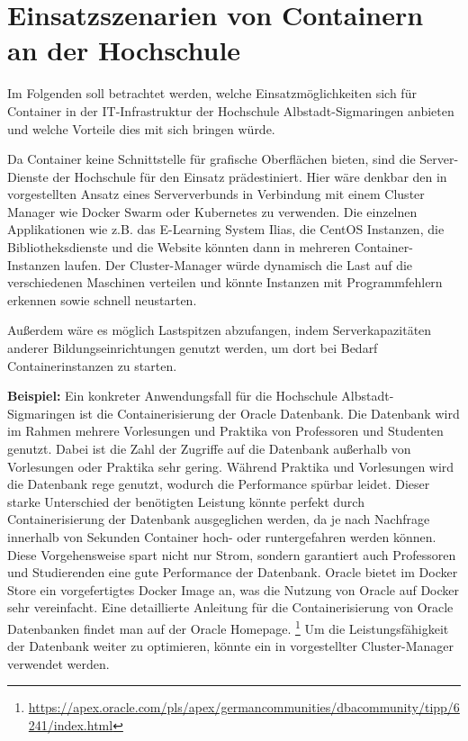 \section{Einsatzszenarien von Containern an der Hochschule}
\label{sec:HS}
Im Folgenden soll betrachtet werden, welche Einsatzmöglichkeiten sich für Container in der IT-Infrastruktur der Hochschule Albstadt-Sigmaringen anbieten und welche Vorteile dies mit sich bringen würde. 

Da Container keine Schnittstelle für grafische Oberflächen bieten, sind die Server-Dienste der Hochschule für den Einsatz prädestiniert.
Hier wäre denkbar den in  vorgestellten Ansatz eines Serververbunds in Verbindung mit einem Cluster Manager wie Docker Swarm oder Kubernetes zu verwenden.
Die einzelnen Applikationen wie z.B. das E-Learning System Ilias, die CentOS Instanzen, die Bibliotheksdienste und die Website könnten dann in mehreren Container-Instanzen laufen.
Der Cluster-Manager würde dynamisch die Last auf die verschiedenen Maschinen verteilen und könnte Instanzen mit Programmfehlern erkennen sowie schnell neustarten.

Außerdem wäre es möglich Lastspitzen abzufangen, indem Serverkapazitäten anderer Bildungseinrichtungen genutzt werden, um dort bei Bedarf Containerinstanzen zu starten.

\textbf{Beispiel:}\newline
Ein konkreter Anwendungsfall für die Hochschule Albstadt-Sigmaringen ist die Containerisierung der Oracle Datenbank. Die Datenbank wird im Rahmen mehrere Vorlesungen und Praktika von Professoren und Studenten genutzt.
Dabei ist die Zahl der Zugriffe auf die Datenbank außerhalb von Vorlesungen oder Praktika sehr gering.
Während Praktika und Vorlesungen wird die Datenbank rege genutzt, wodurch die Performance spürbar leidet.
Dieser starke Unterschied der benötigten Leistung könnte perfekt durch Containerisierung der Datenbank ausgeglichen werden, da je nach Nachfrage innerhalb von Sekunden Container hoch- oder runtergefahren werden können.
Diese Vorgehensweise spart nicht nur Strom, sondern garantiert auch Professoren und Studierenden eine gute Performance der Datenbank. Oracle bietet im Docker Store ein vorgefertigtes Docker Image an, was die Nutzung von Oracle auf Docker sehr vereinfacht.
Eine detaillierte Anleitung für die Containerisierung von Oracle Datenbanken findet man auf der Oracle Homepage.
\footnote{\url{https://apex.oracle.com/pls/apex/germancommunities/dbacommunity/tipp/6241/index.html}}
Um die Leistungsfähigkeit der Datenbank weiter zu optimieren, könnte ein in  vorgestellter Cluster-Manager verwendet werden.
